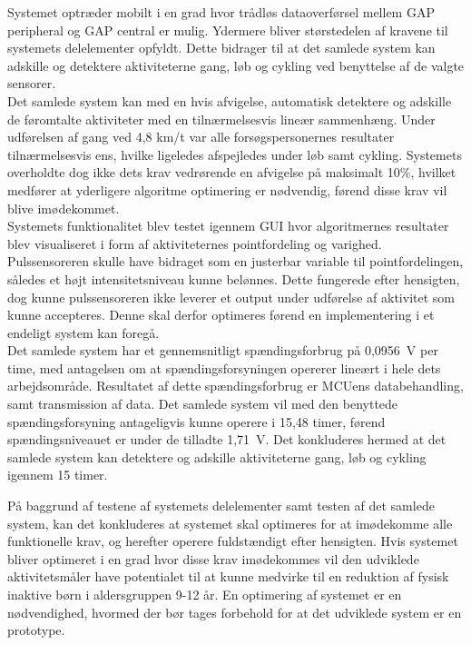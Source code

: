 Systemet optræder  mobilt i en grad hvor trådløs dataoverførsel mellem GAP peripheral og GAP central er mulig. Ydermere bliver størstedelen af kravene til systemets delelementer opfyldt. Dette bidrager til at det samlede system kan adskille og detektere aktiviteterne gang, løb og cykling ved benyttelse af de valgte sensorer. \\
Det samlede system kan med en hvis afvigelse, automatisk detektere og adskille de føromtalte aktiviteter med en tilnærmelsesvis lineær sammenhæng. Under udførelsen af gang ved 4,8 km/t var alle forsøgspersonernes resultater tilnærmelsesvis ens, hvilke ligeledes afspejledes under løb samt cykling. Systemets overholdte dog ikke dets krav vedrørende en afvigelse på maksimalt 10\%, hvilket medfører at yderligere algoritme optimering er nødvendig, førend disse krav vil blive imødekommet. \\
Systemets funktionalitet blev testet igennem GUI hvor algoritmernes resultater blev visualiseret i form af aktiviteternes pointfordeling og varighed. Pulssensoreren skulle have bidraget som en justerbar variable til pointfordelingen, således et højt intensitetsniveau kunne belønnes. Dette fungerede efter hensigten, dog kunne pulssensoreren ikke leverer et output under udførelse af aktivitet som kunne accepteres. Denne skal derfor optimeres førend en implementering i et endeligt system kan foregå. \\
Det samlede system har et gennemsnitligt spændingsforbrug på 0,0956~V per time, med antagelsen om at spændingsforsyningen opererer lineært i hele dets arbejdsområde. Resultatet af dette spændingsforbrug er MCUens databehandling, samt transmission af data. Det samlede system vil med den benyttede spændingsforsyning antageligvis kunne operere i 15,48 timer, førend spændingsniveauet er under de tilladte 1,71~V. Det konkluderes hermed at det samlede system kan detektere og adskille aktiviteterne gang, løb og cykling igennem 15 timer. 

På baggrund af testene af systemets delelementer samt testen af det samlede system, kan det konkluderes at systemet skal optimeres for at imødekomme alle funktionelle krav, og herefter operere fuldstændigt efter hensigten. Hvis systemet bliver optimeret i en grad hvor disse krav imødekommes vil den udviklede aktivitetsmåler have potentialet til at kunne medvirke til en reduktion af fysisk inaktive børn i aldersgruppen 9-12 år. En optimering af systemet er en nødvendighed, hvormed der bør tages forbehold for at det udviklede system er en prototype.%